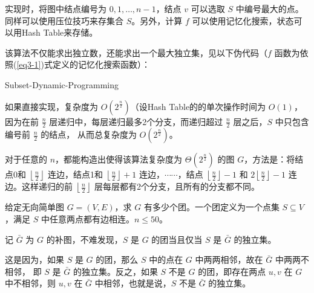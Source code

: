 \documentclass[lang=cn,11pt,a4paper]{elegantpaper}
\begin{document}
实现时，将图中结点编号为 $0, 1, \dots, n - 1$，结点 $v$ 可以选取 $S$ 中编号最大的点。同样可以使用压位技巧来存集合 $S$。另外，计算 $f$ 可以使用记忆化搜索，状态可以用Hash Table来存储。

该算法不仅能求出独立数，还能求出一个最大独立集，见以下伪代码（$f$ 函数为依照(\ref{eq3-1})式定义的记忆化搜索函数）：

\begin{algorithm} 
	\caption{Subset-Dynamic-Programming}\label{alg2} 
	\begin{algorithmic}[1]
            \ELSE
            \ENDIF
        \ENDWHILE
	\end{algorithmic} 
\end{algorithm}

如果直接实现，复杂度为 $O(2^{\frac{n}{2}})$（设Hash Table的的单次操作时间为 $O(1)$，因为在前 $\frac{n}{2}$ 层递归中，每层递归最多2个分支，而递归超过 $\frac{n}{2}$ 层之后，$S$ 中只包含编号前 $\frac{n}{2}$ 的结点， 从而总复杂度为 $O(2^{\frac{n}{2}})$。

对于任意的 $n$，都能构造出使得该算法复杂度为 $\Theta(2^{\frac{n}{2}})$ 的图 $G$，方法是：将结点0和 $\left\lfloor \frac{n}{2} \right\rfloor$ 连边，结点1和 $\left\lfloor \frac{n}{2} \right\rfloor + 1$ 连边，$\cdots\cdots$，结点 $\left\lfloor \frac{n}{2} \right\rfloor - 1$ 和 $2\left\lfloor \frac{n}{2} \right\rfloor - 1$ 连边。这样递归的前 $\left\lfloor \frac{n}{2} \right\rfloor$ 层每层都有2个分支，且所有的分支都不同。

\begin{example}[团的计数]
    给定无向简单图 $G = (V, E)$，求 $G$ 有多少个团。一个团定义为一个点集 $S \subseteq V$，满足 $S$ 中任意两点都有边相连。$n \le 50$。
\end{example}

记 $\bar{G}$ 为 $G$ 的补图，不难发现，$S$ 是 $G$ 的团当且仅当 $S$ 是 $\bar{G}$ 的独立集。

这是因为，如果 $S$ 是 $G$ 的团，那么 $S$ 中的点在 $G$ 中两两相邻，故在 $\bar{G}$ 中两两不相邻， 即 $S$ 是 $\bar{G}$ 的独立集。反之，如果 $S$ 不是 $G$ 的团，即存在两点 $u, v$ 在 $G$ 中不相邻，则 $u, v$ 在 $\bar{G}$ 中相邻，也就是说，$S$ 不是 $\bar{G}$ 的独立集。
\end{document}
